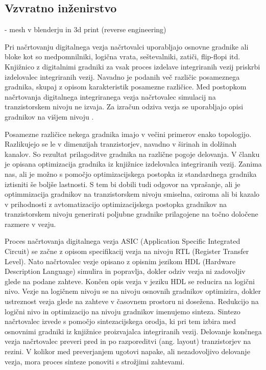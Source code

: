 \documentclass[journal,a4paper,twoside]{sty/IEEEtran}
\begin{document}
\subsection{Vzvratno inženirstvo}
-  mesh v blenderju in 3d print (reverse engineering)





\newpage
Pri načrtovanju digitalnega vezja načrtovalci uporabljajo osnovne gradnike ali bloke \cite{kaeslin} kot so medpomnilniki, logična vrata, seštevalniki, zatiči, flip-flopi itd. Knjižnico z digitalnimi gradniki za vsak proces izdelave integriranih vezij priskrbi izdelovalec integriranih vezij. Navadno je podanih več različic posameznega gradnika, skupaj z opisom karakteristik posamezne različice. Med postopkom načrtovanja digitalnega integriranega vezja načrtovalec simulacij \cite{hspice, kunderth, virtuoso, tuma} na tranzistorskem nivoju ne izvaja. Za izračun odziva vezja se uporabljajo opisi gradnikov na višjem nivoju \cite{thomas, pedroni}.

Posamezne različice nekega gradnika imajo v večini primerov enako topologijo. Razlikujejo se le v dimenzijah tranzistorjev, navadno v širinah in dolžinah kanalov. So rezultat prilagoditve gradnika na različne pogoje delovanja. V članku je opisana optimizacija gradnika iz knjižnice izdelovalca integriranih vezij. Zanima nas, ali je možno s pomočjo optimizacijskega postopka iz standardnega gradnika iztisniti še boljše lastnosti. S tem bi dobili tudi odgovor na vprašanje, ali je optimmizacija gradnikov na tranzistorskem nivoju smiselna, oziroma ali bi kazalo v prihodnosti z avtomatizacijo optimizacijskega postopka gradnikov na tranzistorskem nivoju generirati poljubne gradnike prilagojene na točno določene razmere v vezju.

Proces načrtovanja digitalnega vezja ASIC (Application Specific Integrated Circuit) se začne z opisom specifikacij vezja na nivoju RTL (Register Transfer Level). Nato načrtovalec vezje opisano z opisnim jezikom HDL (Hardware Description Language) simulira in popravlja, dokler odziv vezja ni zadovoljiv glede na podane zahteve. Končen opis vezja v jeziku HDL se reducira na logični nivo. Vezje na logičnem nivoju se na nivoju osnovnih gradnikov optimizira, dokler ustreznost vezja glede na zahteve v časovnem prostoru ni dosežena. Redukcijo na logični nivo in optimizacijo na nivoju gradnikov imenujemo sinteza. Sintezo načrtovalec izvede s pomočjo sintezacijskega orodja, ki pri tem izbira med osnovnimi gradniki iz knjižnice proizvajalca integriranih vezij. Delovanje končnega vezja načrtovalec preveri pred in po razporeditvi (ang. layout) tranzistorjev na rezini. V kolikor med preverjanjem ugotovi napake, ali nezadovoljivo delovanje vezja, mora proces sinteze ponoviti s strožjimi zahtevami.
\end{document}
